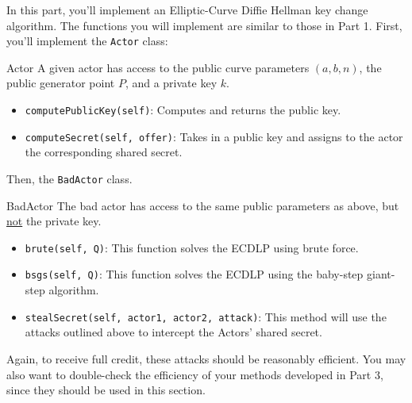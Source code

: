 \documentclass{article}
\begin{document}
    \begin{tcolorbox}[enhanced,interior style={top color=Plum!20,bottom color=Plum!30}]
        In this part, you'll implement an Elliptic-Curve Diffie Hellman key change algorithm. The functions you will implement are similar to those in Part 1. First, you'll implement the \lstinline{Actor} class:
    
        \begin{mybox}[
            colframe=Cerulean!50!black,
            colback=Cerulean!30,
            colbacktitle=Cerulean!,
            coltitle=Cerulean!30!black
            ]{Actor}
            A given actor has access to the public curve parameters $(a, b, n)$, the public generator point $P$, and a private key $k$.
            \begin{itemize}
                \item \lstinline{computePublicKey(self)}: Computes and returns the public key.
                \item \lstinline{computeSecret(self, offer)}: Takes in a public key and assigns to the actor the corresponding shared secret.
            \end{itemize}
    
        \end{mybox}
    
        Then, the \lstinline{BadActor} class.
    
        \begin{mybox}[
            colframe=purple!50!black,
            colback=purple!30,
            colbacktitle=purple!50!white,
            coltitle=purple!30!black,
            ]{BadActor}
            The bad actor has access to the same public parameters as above, but \underline{not} the private key.
            \begin{itemize}
                \item \lstinline{brute(self, Q)}: This function solves the ECDLP using brute force.
                \item \lstinline{bsgs(self, Q)}: This function solves the ECDLP using the baby-step giant-step algorithm.
                \item \lstinline{stealSecret(self, actor1, actor2, attack)}: This method will use the attacks outlined above to intercept the Actors' shared secret.
            \end{itemize}
        \end{mybox}
        Again, to receive full credit, these attacks should be reasonably efficient. You may also want to double-check the efficiency of your methods developed in Part 3, since they should be used in this section.
    \end{tcolorbox}
\end{document}
